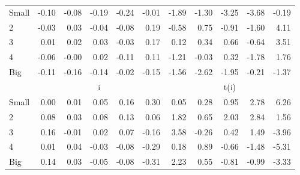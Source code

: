 \begin{table}[!ht]
\begin{tabular}{lrrrrrrrrrr}
    \\
      \cmidrule(r){2-6} \cmidrule(r){7-11}

    Small   & -0.10  & -0.08  & -0.19  & -0.24  & -0.01  & -1.89  & -1.30  & -3.25  & -3.68  & -0.19  \\
         2  & -0.03  & 0.03  & -0.04  & -0.08  & 0.19  & -0.58  & 0.75  & -0.91  & -1.60  & 4.11  \\
         3  & 0.01  & 0.02  & 0.03  & -0.03  & 0.17  & 0.12  & 0.34  & 0.66  & -0.64  & 3.51  \\
         4  & -0.06  & -0.00  & 0.02  & -0.11  & 0.11  & -1.21  & -0.03  & 0.32  & -1.78  & 1.76  \\
    Big     & -0.11  & -0.16  & -0.14  & -0.02  & -0.15  & -1.56  & -2.62  & -1.95  & -0.21  & -1.37  \\

  
    
      & \multicolumn{5}{c}{i} & \multicolumn{5}{c}{t(i)}
    
    \\
      \cmidrule(r){2-6} \cmidrule(r){7-11}

    Small   & 0.00  & 0.01  & 0.05  & 0.16  & 0.30  & 0.05  & 0.28  & 0.95  & 2.78  & 6.26  \\
         2  & 0.08  & 0.03  & 0.08  & 0.13  & 0.06  & 1.82  & 0.65  & 2.03  & 2.84  & 1.56  \\
         3  & 0.16  & -0.01  & 0.02  & 0.07  & -0.16  & 3.58  & -0.26  & 0.42  & 1.49  & -3.96  \\
         4  & 0.01  & 0.04  & -0.03  & -0.08  & -0.29  & 0.18  & 0.89  & -0.66  & -1.48  & -5.31  \\
    Big     & 0.14  & 0.03  & -0.05  & -0.08  & -0.31  & 2.23  & 0.55  & -0.81  & -0.99  & -3.33  \\

  

  \bottomrule
\end{tabular}
\label{tbl:25_Size_Beta_FF2016}
\end{table}